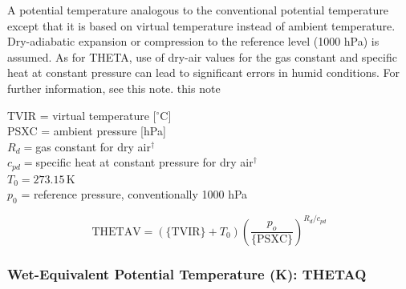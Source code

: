 \documentclass[
  english,
]{book}
\begin{document}
A potential temperature analogous to the conventional potential temperature except that it is based on virtual temperature instead of ambient temperature. Dry-adiabatic expansion or compression to the reference level (1000 hPa) is assumed. As for THETA, use of dry-air values for the gas constant and specific heat at constant pressure can lead to significant errors in humid conditions. For further information, see this note.
this note

TVIR = virtual temperature {[}\(^{\circ}\mathrm{C}\){]}\\
PSXC = ambient pressure {[}hPa{]}\\
\(R_{d}=\)gas constant for dry air\(^{\dagger}\)\\
\(c_{pd}=\)specific heat at constant pressure for dry air\(^{\dagger}\)\\
\(T_{0}=273.15\,\)K\\
\(p_{0}\) = reference pressure, conventionally 1000 hPa

\begin{equation}
\mathrm{THETAV}=\left(\mathrm{\{TVIR\}}+T_{0}\right)\left(\frac{p_{o}}{\mathrm{\{PSXC\}}}\right)^{R_{d}/c_{pd}}
\label{eq:THETAV}
\end{equation}

\hypertarget{thetaq}{%
\subsubsection*{Wet-Equivalent Potential Temperature (K): THETAQ}\label{thetaq}}
\end{document}
